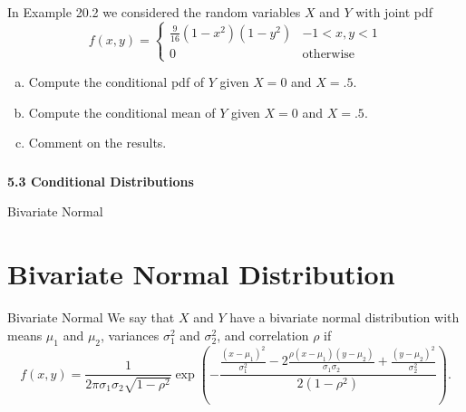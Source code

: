 \begin{frame}
  \begin{block}{\example}
    In Example 20.2 we considered the random variables $X$ and $Y$ with joint pdf
    \[
      f(x,y)=
      \left\{
        \begin{array}{ll}
          \frac{9}{16}(1-x^2)(1-y^2) & -1 < x,y < 1\\
          0 & \mbox{otherwise}
        \end{array}
      \right.
    \]

    \begin{enumerate}[a)]
    \item Compute the conditional pdf of $Y$ given $X=0$ and $X=.5$. 
    \item Compute the conditional mean of $Y$ given $X=0$ and $X=.5$.
    \item Comment on the results.
    \end{enumerate}
  \end{block}
\end{frame}

\begin{frame}
  \frametitle{}
  
  \begin{center}
    \Large{\textbf{5.3 Conditional Distributions}}

    \bigskip

    \Large{Bivariate Normal}
  \end{center}
  
\end{frame}

\section{Bivariate Normal Distribution}

\begin{frame}
  \begin{block}{Bivariate Normal}
    We say that $X$ and $Y$ have a bivariate normal distribution with means $\mu_1$ and $\mu_2$, variances $\sigma^2_1$ and $\sigma^2_2$, and correlation $\rho$ if
    \[
      f(x,y)=
      \frac{1}{2\pi\sigma_1\sigma_2\sqrt{1-\rho^2}}
      \exp\left(-\frac{\frac{(x-\mu_1)^2}{\sigma^2_1}-2\frac{\rho(x-\mu_1)(y-\mu_2)}{\sigma_1\sigma_2}+\frac{(y-\mu_2)^2}{\sigma^2_2}}{2(1-\rho^2)}\right).
    \]

  \end{block}
\end{frame}

